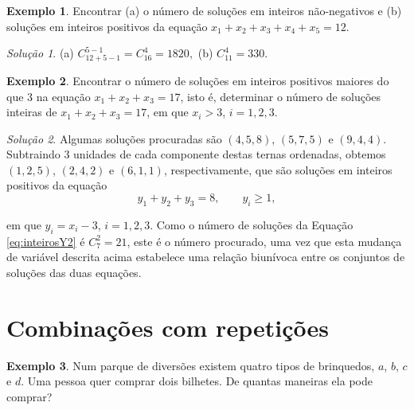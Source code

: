 \documentclass[]{book}
\theoremstyle{definition}
\theoremstyle{definition}
\newtheorem{example}{Exemplo}[chapter]
\theoremstyle{definition}
\theoremstyle{remark}
\newtheorem*{solution}{Solução}
\begin{document}
\begin{example}
\protect\hypertarget{exm:unnamed-chunk-62}{}{\label{exm:unnamed-chunk-62} }Encontrar (a) o número de soluções em inteiros não-negativos e (b) soluções em inteiros positivos da equação \(x_1 + x_2 + x_3 + x_4 + x_5 = 12\).
\end{example}

\begin{solution}
\iffalse{} {Solução. } \fi{}(a) \(C^{5-1}_{12+5-1} = C^{4}_{16} = 1820,\)
(b) \(C^{4}_{11} = 330.\)
\end{solution}

\begin{example}
\protect\hypertarget{exm:unnamed-chunk-64}{}{\label{exm:unnamed-chunk-64} }Encontrar o número de soluções em inteiros positivos maiores do que \(3\) na equação \(x_1 + x_2 + x_3 = 17\), isto é, determinar o número de soluções inteiras de \(x_1 + x_2 + x_3 = 17\), em que \(x_i>3\), \(i=1,2,3\).
\end{example}

\begin{solution}
\iffalse{} {Solução. } \fi{}Algumas soluções procuradas são \((4,5,8)\), \((5,7,5)\) e \((9,4,4)\).
Subtraindo \(3\) unidades de cada componente destas ternas ordenadas, obtemos \((1,2,5)\), \((2,4,2)\) e \((6,1,1)\), respectivamente, que são soluções em inteiros positivos da equação
\begin{equation}
y_1 + y_2 + y_3 = 8, \qquad y_i\geq 1,
\label{eq:inteirosY2}
\end{equation}

em que \(y_i=x_i-3\), \(i=1,2,3\).
Como o número de soluções da Equação \eqref{eq:inteirosY2} é \(C^2_7=21\), este é o número procurado, uma vez que esta mudança de variável descrita acima estabelece uma relação biunívoca entre os conjuntos de soluções das duas equações.
\end{solution}

\hypertarget{combinauxe7uxf5es-com-repetiuxe7uxf5es}{%
\section{Combinações com repetições}\label{combinauxe7uxf5es-com-repetiuxe7uxf5es}}

\begin{example}
\protect\hypertarget{exm:parqueDiversoes}{}{\label{exm:parqueDiversoes} }Num parque de diversões existem quatro tipos de brinquedos, \(a\), \(b\), \(c\) e \(d\).
Uma pessoa quer comprar dois bilhetes.
De quantas maneiras ela pode comprar?
\end{example}
\end{document}
